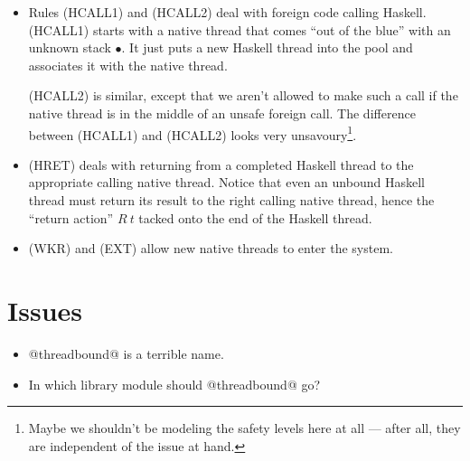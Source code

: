 \documentclass{article}
\newcommand{\ret}[1]{R~#1}
\begin{document}
\begin{itemize}
\item Rules (HCALL1) and (HCALL2) deal with foreign code calling Haskell.
(HCALL1) starts with a native thread that comes ``out of the blue'' with an
unknown stack $\bullet$. It just puts a new Haskell thread into the pool and
associates it with the native thread.

(HCALL2) is similar, except that we aren't allowed to make such a call if
the native thread is in the middle of an unsafe foreign call.  The difference
between (HCALL1) and (HCALL2) looks very unsavoury\footnote{Maybe we shouldn't
be modeling the safety levels here at all --- after all, they are independent
of the issue at hand.}.

\item (HRET) deals with returning from a completed Haskell thread to the
appropriate calling native thread.  Notice that even an unbound Haskell thread
must return its result to the right calling native thread, hence the
``return action'' $\ret{t}$ tacked onto the end of the Haskell thread.

\item (WKR) and (EXT) allow new native threads to enter the system.

\end{itemize}

\section{Issues}

\begin{itemize}
\item @threadbound@ is a terrible name.
\item In which library module should @threadbound@ go?
\end{itemize}
\end{document}
